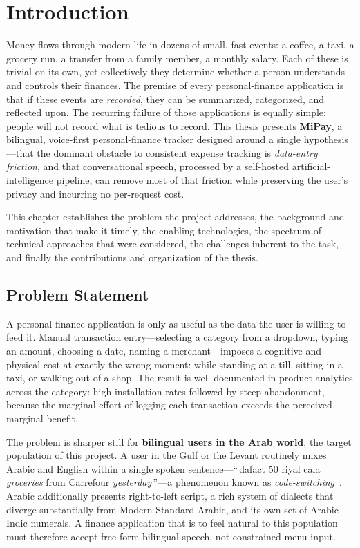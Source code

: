 \chapter{Introduction}

\setlength{\parindent}{1em}

\normalsize

Money flows through modern life in dozens of small, fast events: a coffee, a
taxi, a grocery run, a transfer from a family member, a monthly salary. Each of
these is trivial on its own, yet collectively they determine whether a person
understands and controls their finances. The premise of every personal-finance
application is that if these events are \emph{recorded}, they can be summarized,
categorized, and reflected upon. The recurring failure of those applications is
equally simple: people will not record what is tedious to record. This thesis
presents \textbf{MiPay}, a bilingual, voice-first personal-finance tracker
designed around a single hypothesis---that the dominant obstacle to consistent
expense tracking is \emph{data-entry friction}, and that conversational speech,
processed by a self-hosted artificial-intelligence pipeline, can remove most of
that friction while preserving the user's privacy and incurring no per-request
cost.

This chapter establishes the problem the project addresses, the background and
motivation that make it timely, the enabling technologies, the spectrum of
technical approaches that were considered, the challenges inherent to the task,
and finally the contributions and organization of the thesis.

\section{Problem Statement}

A personal-finance application is only as useful as the data the user is willing
to feed it. Manual transaction entry---selecting a category from a dropdown,
typing an amount, choosing a date, naming a merchant---imposes a cognitive and
physical cost at exactly the wrong moment: while standing at a till, sitting in a
taxi, or walking out of a shop. The result is well documented in product
analytics across the category: high installation rates followed by steep
abandonment, because the marginal effort of logging each transaction exceeds the
perceived marginal benefit.

The problem is sharper still for \textbf{bilingual users in the Arab world}, the
target population of this project. A user in the Gulf or the Levant routinely
mixes Arabic and English within a single spoken sentence---``\,dafact 50
riyal cala \emph{groceries} from Carrefour \emph{yesterday}\,''---a phenomenon
known as \emph{code-switching}~\cite{sitaram2019codeswitch}. Arabic additionally
presents right-to-left script, a rich system of dialects that diverge
substantially from Modern Standard Arabic, and its own set of Arabic-Indic
numerals. A finance application that is to feel natural to this population must
therefore accept free-form bilingual speech, not constrained menu input.

